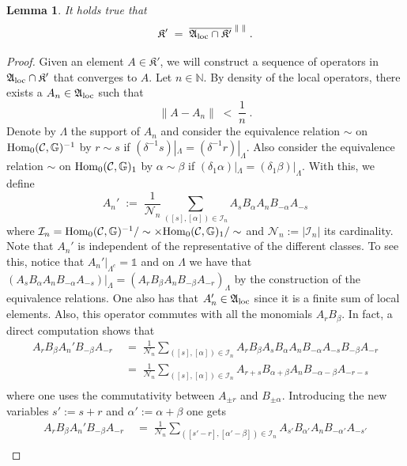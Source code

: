 \documentclass[a4paper,12pt,twoside,reqno]{amsart}
\theoremstyle{plain}
\newtheorem{lemma}[teo]{Lemma}
\theoremstyle{definition}
\theoremstyle{remark}
\numberwithin{equation}{section}
\numberwithin{figure}{section}
\numberwithin{table}{section}
\newcommand{\NN}{\mathbb{N}}
\def\norm#1{\left\|#1\right\|}
\newcommand{\f}[1]{\mathcal{#1}}
\newcommand{\n}[1]{\mathbb{#1}}
\begin{document}
	
	\begin{lemma}\label{lemma:commutant_loc}
		It holds true that
		\[
		\mathfrak{K}' 
		\;=\;  \overline{\mathfrak{A}_{\rm loc}\cap\mathfrak{K}'}^{\;\|\;\|}
		\;.
		\]
	\end{lemma}
	\begin{proof}
		Given an element $A\in\mathfrak{K}'$, we will construct a sequence of operators in $\mathfrak{A}_{\rm loc} \cap \mathfrak{K}'$ that converges to $A$. Let $n\in\NN$. By density of the local operators, there exists a $A_n\in\mathfrak{A}_{\rm loc}$ such that $$\norm{A-A_n}\;<\; \frac{1}{n}\;.$$
		Denote by $\Lambda$ the support of $A_n$ and consider the equivalence relation $\sim$ on $ {\rm Hom}_0(\f{C},\n{G})^{-1}$ by $r\sim s$ if $(\delta^{-1}s)|_\Lambda=(\delta^{-1}r)|_\Lambda$. Also consider the equivalence relation $\sim$ on ${\rm Hom}_0(\f{C},\n{G})_1$ by $\alpha\sim \beta$ if $(\delta_{1}\alpha)|_\Lambda=(\delta_{1}\beta)|_\Lambda$. With this, we define 
		$$
		A_n'\;:=\;\frac{1}{\mathcal{N}_n}\sum_{([s],[\alpha])\in \mathcal{I}_n }A_sB_\alpha A_n B_{-\alpha}A_{-s}$$
		where $\mathcal{I}_n={\rm Hom}_0(\f{C},\n{G})^{-1}/\sim\times{\rm Hom}_0(\f{C},\n{G})_1/\sim$ and $\mathcal{N}_n:=|\mathcal{I}_n|$ its cardinality. 
		Note that $A_n'$ is independent of the representative of the different classes. To see this, notice that $A_n'|_{\Lambda^c}=\n{1}$ and on $\Lambda$ we have that $(A_sB_\alpha A_n B_{-\alpha}A_{-s})|_\Lambda=(A_rB_\beta A_n B_{-\beta}A_{-r})_\Lambda$ by the construction of the equivalence relations.
		One also has that  $A_n'\in\mathfrak{A}_{\rm loc}$ since it is a finite sum of local elements. Also, this operator commutes with all the monomials $A_rB_\beta$. 
		In fact, a direct computation shows that
		\begin{align*}
			A_rB_{\beta}A_n'B_{-\beta}A_{-r}\;&=\;\frac{1}{\mathcal{N}_n}\sum_{([s],[\alpha])\in \mathcal{I}_n  }A_rB_\beta A_sB_\alpha A_n B_{-\alpha}A_{-s} B_{-\beta}A_{-r}\\
			&=\;\frac{1}{\mathcal{N}_n}\sum_{([s],[\alpha])\in \mathcal{I}_n  }A_{r+s}B_{\alpha+\beta}A_nB_{-\alpha-\beta}A_{-r-s}\\
		\end{align*}
		where one uses the commutativity between $A_{\pm r}$ and $B_{\pm\alpha}$. Introducing the new variables      
		$s':=s+r$ and $\alpha':=\alpha+\beta$ one gets 
		\begin{align*}
			A_rB_{\beta}A_n'B_{-\beta}A_{-r}\;&=\;\frac{1}{\mathcal{N}_n}\sum_{([s'-r],[\alpha'-\beta])\in \mathcal{I}_n  }
			A_{s'}B_{\alpha'}A_nB_{-\alpha'}A_{-s'}\\

\end{align*}
\end{proof}
\end{document}

